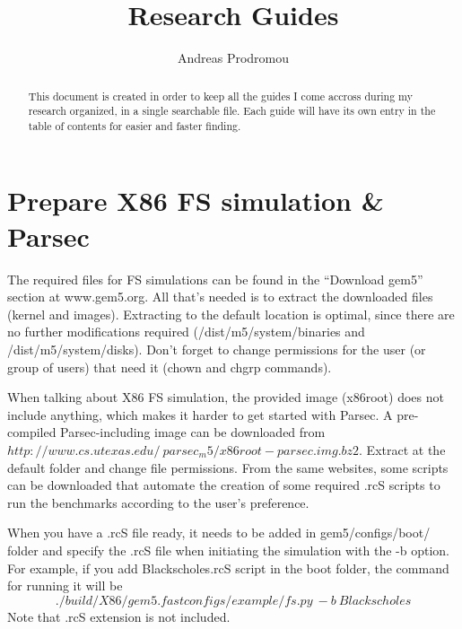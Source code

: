 \documentclass[a4paper,12pt]{article}
\begin{document}
\title{Research Guides}
\author{Andreas Prodromou}
\maketitle
\tableofcontents
\clearpage

\renewcommand{\abstractname}{Introduction -- Explanation}
\begin{abstract}
This document is created in order to keep all the guides I come accross during my research organized, in a single searchable file. Each guide will have its own entry in the table of contents for easier and faster finding.
\end{abstract}

\section{Prepare X86 FS simulation \& Parsec}
The required files for FS simulations can be found in the ``Download gem5'' section at www.gem5.org. All that's needed is to extract the downloaded files (kernel and images). Extracting to the default location is optimal, since there are no further modifications required (/dist/m5/system/binaries and /dist/m5/system/disks). Don't forget to change permissions for the user (or group of users) that need it (chown and chgrp commands). 

When talking about X86 FS simulation, the provided image (x86root) does not include anything, which makes it harder to get started with Parsec. A pre-compiled Parsec-including image can be downloaded from $http://www.cs.utexas.edu/~parsec_m5/x86root-parsec.img.bz2$. Extract at the default folder and change file permissions. From the same websites, some scripts can be downloaded that automate the creation of some required .rcS scripts to run the benchmarks according to the user's preference.

When you have a .rcS file ready, it needs to be added in gem5/configs/boot/ folder and specify the .rcS file when initiating the simulation with the -b option. For example, if you add Blackscholes.rcS script in the boot folder, the command for running it will be $$./build/X86/gem5.fast configs/example/fs.py\ -b\ Blackscholes$$ Note that .rcS extension is not included.
\end{document}
